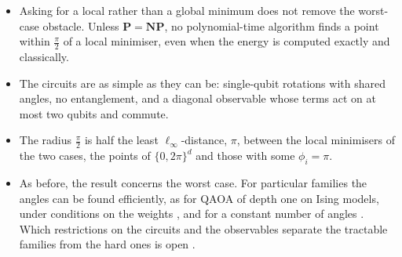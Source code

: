 \documentclass[handoutsbeamer.tex]{subfiles}
\begin{document}
\begin{frame}
\end{frame}

\begin{frame}
\onp{\small}
\begin{itemize}\setlength\itemsep{0.3em}
    \item Asking for a local rather than a global minimum does not remove the worst-case obstacle. Unless $\mathbf P = \mathbf{NP}$, no polynomial-time algorithm finds a point within $\frac\pi2$ of a local minimiser, even when the energy is computed exactly and classically.
    \item The circuits are as simple as they can be: single-qubit rotations with shared angles, no entanglement, and a diagonal observable whose terms act on at most two qubits and commute.
    \item The radius $\frac\pi2$ is half the least $\ell_\infty$-distance, $\pi$, between the local minimisers of the two cases, the points of $\{0,2\pi\}^d$ and those with some $\phi_i = \pi$.
    \item As before, the result concerns the worst case. For particular families the angles can be found efficiently, as for QAOA of depth one on Ising models, under conditions on the weights \citep{Vijendran2025}, and for a constant number of angles \citep{sakos2026global}. Which restrictions on the circuits and the observables separate the tractable families from the hard ones is open \citep{koh2026training}.
\end{itemize}
\end{frame}
\end{document}
